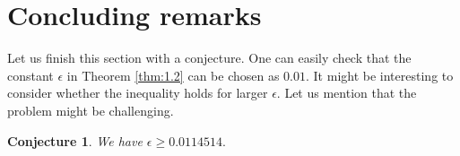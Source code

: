 \documentclass[AER]{AEA}
\DeclareRobustCommand{\AERlink}[1]{}
\newtheorem{conjecture}[theorem]{Conjecture}
\begin{document}
\section{Concluding remarks}

Let us finish this section with a conjecture. One can easily check that the constant $\epsilon$ in Theorem \ref{thm:1.2} can be chosen as $0.01$. It might be interesting to consider whether the inequality holds for larger $\epsilon$. Let us mention that the problem might be challenging.

\begin{conjecture}
We have $\epsilon \ge 0.0114514.$
\end{conjecture}


\DeclareRobustCommand{\AERlink}[1]{\makebox[0pt][r]{\href{#1}{\color{blue}$\blacktriangleright$}\hspace{0.3em}}}



\end{document}
